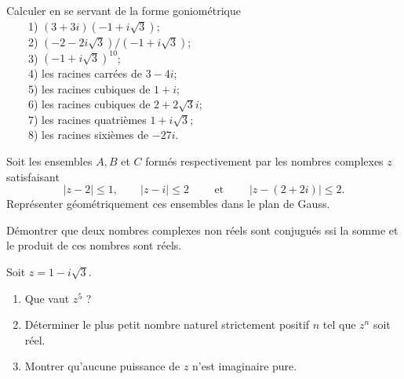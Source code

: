 \documentclass[12pt,french,oneside,a4paper]{memoir} %
\begin{document}
\begin{exo}
Calculer en se servant de la forme goniométrique\\
\indent~~~~1) $(3+3i)(-1+i \sqrt{3})$;\\ 
\indent~~~~2) $(-2-2i \sqrt{3})/(-1+i \sqrt{3})$; \\
\indent~~~~3) $(-1+i \sqrt{3})^{10}$; \\
\indent~~~~4) les racines carrées de $3-4i$; \\
\indent~~~~5) les racines cubiques de $1+i$;\\
\indent~~~~6) les racines cubiques de $2+2\sqrt{3}i$; \\
\indent~~~~7) les racines quatrièmes $1+i \sqrt{3}$; \\
\indent~~~~8) les racines sixièmes de $-27i$.
\end{exo}
\begin{exo}
Soit les ensembles $A, B$ et $C$ formés respectivement par les nombres complexes $z$ satisfaisant
\begin{equation*}
\vert z-2 \vert \leq 1, \qquad \vert z-i \vert \leq 2 \qquad \mbox{ et } 
\qquad \vert z-(2+2i) \vert \leq 2.
\end{equation*}
Représenter géométriquement ces ensembles dans le plan de Gauss.
\end{exo}
\begin{exo}
Démontrer que deux nombres complexes non réels sont conjugués ssi la somme et 
le produit de ces nombres sont réels.
\end{exo}

\begin{exo}
Soit $z=1-i \sqrt{3}$. 
\begin{enumerate}
\item Que vaut $z^5$ ?
\item Déterminer le plus petit nombre naturel strictement positif $n$ tel que $z^n$ 
soit réel.
\item Montrer qu'aucune puissance de $z$ n'est imaginaire pure.
\end{enumerate}
\end{exo}
\end{document}

